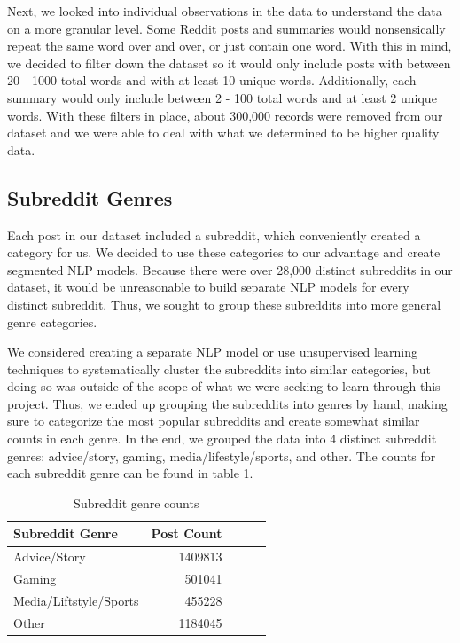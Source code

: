 \documentclass[11pt,a4paper, twocolumn]{article}
\begin{document}
Next, we looked into individual observations in the data to understand the data on a more granular level. 
Some Reddit posts and summaries would nonsensically repeat the same word over and over, or just contain one word. 
With this in mind, we decided to filter down the dataset so it would only include posts with between 20 - 1000 total words and with at least 10 unique words. 
Additionally, each summary would only include between 2 - 100 total words and at least 2 unique words. 
With these filters in place, about 300,000 records were removed from our dataset and we were able to deal with what we determined to be higher quality data. 

\subsection{Subreddit Genres}

Each post in our dataset included a subreddit, which conveniently created a category for us. 
We decided to use these categories to our advantage and create segmented NLP models. 
Because there were over 28,000 distinct subreddits in our dataset, it would be unreasonable to build separate NLP models for every distinct subreddit. 
Thus, we sought to group these subreddits into more general genre categories. 

We considered creating a separate NLP model or use unsupervised learning techniques to systematically cluster the subreddits into similar categories, 
but doing so was outside of the scope of what we were seeking to learn through this project. 
Thus, we ended up grouping the subreddits into genres by hand, making sure to categorize the most popular subreddits and create somewhat similar counts in each genre. 
In the end, we grouped the data into 4 distinct subreddit genres: advice/story, gaming, media/lifestyle/sports, and other. 
The counts for each subreddit genre can be found in table 1.

\begin{table}[h]
  \centering
  \begin{tabular}{lrlll}
  \hline \textbf{Subreddit Genre} & \textbf{Post Count}\\ \hline
  Advice/Story & 1409813 \\
  Gaming & 501041 \\
  Media/Liftstyle/Sports & 455228 \\
  Other & 1184045 \\
  \hline
  \end{tabular}
  \caption{\label{subreddit_counts} Subreddit genre counts}
\end{table}
\end{document}
